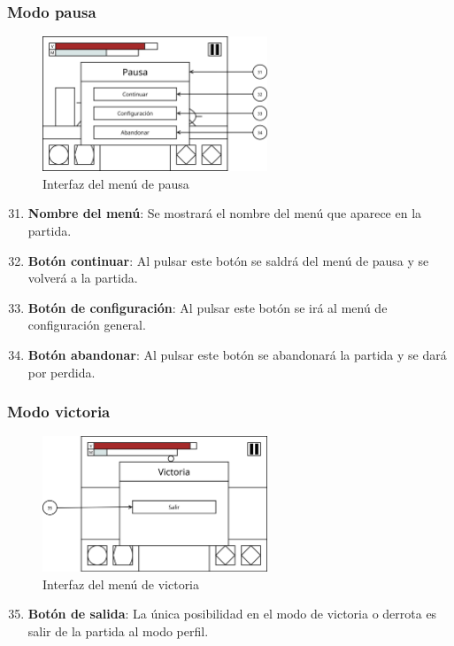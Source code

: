 \subsubsection{Modo pausa}
\begin{figure}[H]
    \centering
    \includegraphics[width=0.6\textwidth]{5-Cuerpo/Chapter5/5.5/I7.png} %
    \caption{Interfaz del menú de pausa}
    \label{fig:Interface_Pausa}
\end{figure}
\begin{enumerate}\setcounter{enumi}{30}
    \item \textbf{Nombre del menú}: Se mostrará el nombre del menú que aparece
    en la partida.
    \item \textbf{Botón continuar}: Al pulsar este botón se saldrá del menú de
    pausa y se volverá a la partida.
    \item \textbf{Botón de configuración}: Al pulsar este botón se irá al menú
    de configuración general.
    \item \textbf{Botón abandonar}: Al pulsar este botón se abandonará la
    partida y se dará por perdida.
\end{enumerate}

\subsubsection{Modo victoria}
\begin{figure}[H]
    \centering
    \includegraphics[width=0.6\textwidth]{5-Cuerpo/Chapter5/5.5/I8.png} %
    \caption{Interfaz del menú de victoria}
    \label{fig:Interface_Victoria}
\end{figure}
\begin{enumerate}\setcounter{enumi}{34}
    \item \textbf{Botón de salida}: La única posibilidad en el modo de victoria
    o derrota es salir de la partida al modo perfil.
\end{enumerate}

